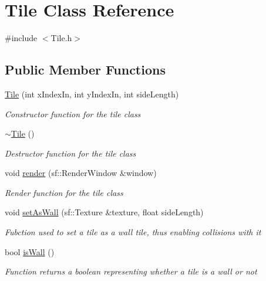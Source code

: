 \hypertarget{class_tile}{}\section{Tile Class Reference}
\label{class_tile}


{\ttfamily \#include $<$Tile.\+h$>$}

\subsection*{Public Member Functions}
\begin{DoxyCompactItemize}
\item 
\mbox{\hyperlink{class_tile_a6019448815dd11c1a95d93b83fbda899}{Tile}} (int x\+Index\+In, int y\+Index\+In, int side\+Length)
\begin{DoxyCompactList}\small\item\em Constructor function for the tile class \end{DoxyCompactList}\item 
\mbox{\hyperlink{class_tile_a98634abbd93fa13d0578d7103202d03d}{$\sim$\+Tile}} ()
\begin{DoxyCompactList}\small\item\em Destructor function for the tile class \end{DoxyCompactList}\item 
void \mbox{\hyperlink{class_tile_a57444de210a362d359197d5a6b5e16e9}{render}} (sf\+::\+Render\+Window \&window)
\begin{DoxyCompactList}\small\item\em Render function for the tile class \end{DoxyCompactList}\item 
void \mbox{\hyperlink{class_tile_accf1f91aace03c7b43bc17b57db57a71}{set\+As\+Wall}} (sf\+::\+Texture \&texture, float side\+Length)
\begin{DoxyCompactList}\small\item\em Fubction used to set a tile as a wall tile, thus enabling collisions with it \end{DoxyCompactList}\item 
bool \mbox{\hyperlink{class_tile_a59472890fde600cb1f11367147c92e74}{is\+Wall}} ()
\begin{DoxyCompactList}\small\item\em Function returns a boolean representing whether a tile is a wall or not \end{DoxyCompactList}\item 

\end{DoxyCompactItemize}
